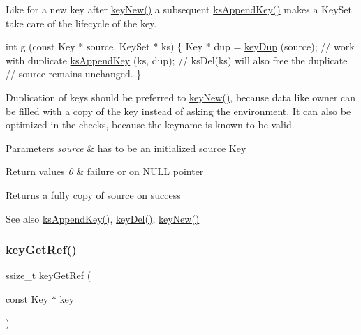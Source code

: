 Like for a new key after \hyperlink{group__key_gad23c65b44bf48d773759e1f9a4d43b89}{key\+New()} a subsequent \hyperlink{group__keyset_gaa5a1d467a4d71041edce68ea7748ce45}{ks\+Append\+Key()} makes a Key\+Set take care of the lifecycle of the key.


\begin{DoxyCode}
\textcolor{keywordtype}{int} g (\textcolor{keyword}{const} Key * source, KeySet * ks)
\{
        Key * dup = \hyperlink{group__key_gae6ec6a60cc4b8c1463fa08623d056ce3}{keyDup} (source);
        \textcolor{comment}{// work with duplicate}
        \hyperlink{group__keyset_gaa5a1d467a4d71041edce68ea7748ce45}{ksAppendKey} (ks, dup);
        \textcolor{comment}{// ksDel(ks) will also free the duplicate}
        \textcolor{comment}{// source remains unchanged.}
\}
\end{DoxyCode}


Duplication of keys should be preferred to \hyperlink{group__key_gad23c65b44bf48d773759e1f9a4d43b89}{key\+New()}, because data like owner can be filled with a copy of the key instead of asking the environment. It can also be optimized in the checks, because the keyname is known to be valid.


\begin{DoxyParams}{Parameters}
{\em source} & has to be an initialized source Key \\
\hline
\end{DoxyParams}

\begin{DoxyRetVals}{Return values}
{\em 0} & failure or on N\+U\+LL pointer \\
\hline
\end{DoxyRetVals}
\begin{DoxyReturn}{Returns}
a fully copy of source on success 
\end{DoxyReturn}
\begin{DoxySeeAlso}{See also}
\hyperlink{group__keyset_gaa5a1d467a4d71041edce68ea7748ce45}{ks\+Append\+Key()}, \hyperlink{group__key_ga3df95bbc2494e3e6703ece5639be5bb1}{key\+Del()}, \hyperlink{group__key_gad23c65b44bf48d773759e1f9a4d43b89}{key\+New()} 
\end{DoxySeeAlso}
\mbox{\label{group__key_ga4aabc4272506dd63161db2bbb42de8ae}} 
\subsubsection{\texorpdfstring{key\+Get\+Ref()}{keyGetRef()}}
{\footnotesize\ttfamily ssize\+\_\+t key\+Get\+Ref (\begin{DoxyParamCaption}\item[{const Key $\ast$}]{key }\end{DoxyParamCaption})}



